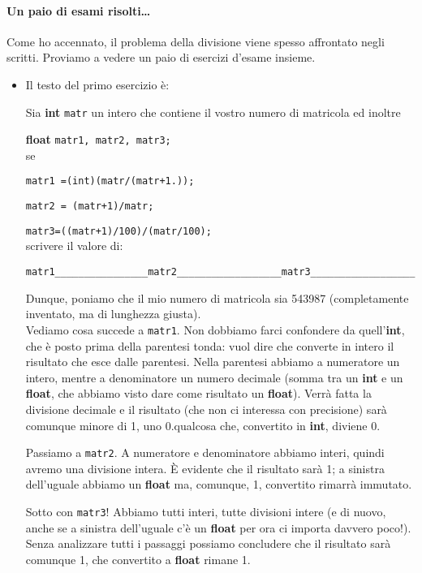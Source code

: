 	
	\paragraph{Un paio di esami risolti\ldots} Come ho accennato, il problema della divisione viene spesso affrontato negli scritti. Proviamo a vedere un paio di esercizi d'esame insieme.
\begin{itemize}


\item	Il testo del primo esercizio è:

\begin{shaded}
	
Sia \textbf{int} \verb|matr| un intero che contiene il vostro numero di matricola ed inoltre

\qquad\textbf{float} \verb|matr1, matr2, matr3;|\\
se

\qquad\verb|matr1 =(int)(matr/(matr+1.));|

\qquad\verb|matr2 = (matr+1)/matr;|

\qquad\verb|matr3=((matr+1)/100)/(matr/100);|\\
scrivere il valore di:

\qquad\verb|matr1________________matr2__________________matr3__________________|

\end{shaded}
	Dunque, poniamo che il mio numero di matricola sia 543987 (completamente inventato, ma di lunghezza giusta). \\
	Vediamo cosa succede a \verb|matr1|. Non dobbiamo farci confondere da quell'\textbf{int}, che è posto prima della parentesi tonda: vuol dire che converte in intero il risultato che esce dalle parentesi. Nella parentesi abbiamo a numeratore un intero, mentre a denominatore un numero decimale (somma tra un \textbf{int} e un \textbf{float}, che abbiamo visto dare come risultato un \textbf{float}). Verrà fatta la divisione decimale e il risultato (che non ci interessa con precisione) sarà comunque minore di 1, uno 0.qualcosa che, convertito in \textbf{int}, diviene 0.
	
	Passiamo a \verb|matr2|. A numeratore e denominatore abbiamo interi, quindi avremo una divisione intera. \`E evidente che il risultato sarà 1; a sinistra dell'uguale abbiamo un \textbf{float} ma, comunque, 1, convertito rimarrà immutato.
	
	Sotto con \verb|matr3|! Abbiamo tutti interi, tutte divisioni intere (e di nuovo, anche se a sinistra dell'uguale c'è un \textbf{float} per ora ci importa davvero poco!). Senza analizzare tutti i passaggi possiamo concludere che il risultato sarà comunque 1, che convertito a \textbf{float} rimane 1. 
	

\end{itemize}
